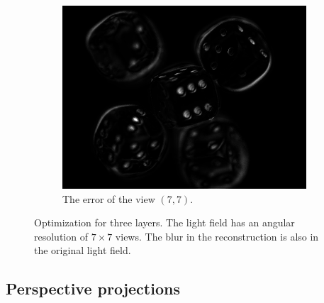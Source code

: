 \documentclass[11pt,a4paper,titlepage]{article}
\begin{document}
\begin{figure}[h]
\begin{subfigure}[t]{0.4\textwidth}
		\includegraphics[width=\textwidth]{results/dice_orthographic_rec_fov10_blurry_3Layers/custom_view_error.png}
		\caption{The error of the view $\left( 7, 7 \right)$.}
	\end{subfigure}

	\caption{Optimization for three layers. The light field has an angular resolution of $7\times 7$ views. The blur in the reconstruction is also in the original light field.}
\end{figure}

\clearpage
\subsection{Perspective projections}
\end{document}
